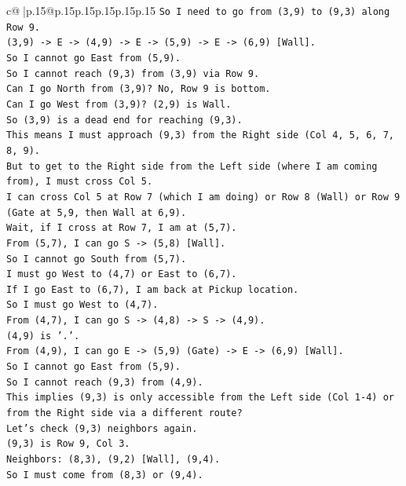 \documentclass{article}
\begin{document}
{\begin{supertabular}{c@{$\;$}|p{.15\linewidth}@{}p{.15\linewidth}p{.15\linewidth}p{.15\linewidth}p{.15\linewidth}p{.15\linewidth}}
{{{\texttt{So I need to go from (3,9) to (9,3) along Row 9.} \\
\texttt{(3,9) {-}> E {-}> (4,9) {-}> E {-}> (5,9) {-}> E {-}> (6,9) {[}Wall{]}.} \\
\texttt{So I cannot go East from (5,9).} \\
\texttt{So I cannot reach (9,3) from (3,9) via Row 9.} \\
\texttt{Can I go North from (3,9)? No, Row 9 is bottom.} \\
\texttt{Can I go West from (3,9)? (2,9) is Wall.} \\
\texttt{So (3,9) is a dead end for reaching (9,3).} \\
\texttt{This means I must approach (9,3) from the Right side (Col 4, 5, 6, 7, 8, 9).} \\
\texttt{But to get to the Right side from the Left side (where I am coming from), I must cross Col 5.} \\
\texttt{I can cross Col 5 at Row 7 (which I am doing) or Row 8 (Wall) or Row 9 (Gate at 5,9, then Wall at 6,9).} \\
\texttt{Wait, if I cross at Row 7, I am at (5,7).} \\
\texttt{From (5,7), I can go S {-}> (5,8) {[}Wall{]}.} \\
\texttt{So I cannot go South from (5,7).} \\
\texttt{I must go West to (4,7) or East to (6,7).} \\
\texttt{If I go East to (6,7), I am back at Pickup location.} \\
\texttt{So I must go West to (4,7).} \\
\texttt{From (4,7), I can go S {-}> (4,8) {-}> S {-}> (4,9).} \\
\texttt{(4,9) is '.'.} \\
\texttt{From (4,9), I can go E {-}> (5,9) (Gate) {-}> E {-}> (6,9) {[}Wall{]}.} \\
\texttt{So I cannot go East from (5,9).} \\
\texttt{So I cannot reach (9,3) from (4,9).} \\
\texttt{This implies (9,3) is only accessible from the Left side (Col 1{-}4) or from the Right side via a different route?} \\
\texttt{Let's check (9,3) neighbors again.} \\
\texttt{(9,3) is Row 9, Col 3.} \\
\texttt{Neighbors: (8,3), (9,2) {[}Wall{]}, (9,4).} \\
\texttt{So I must come from (8,3) or (9,4).} \\
}}}
\end{supertabular}}
\end{document}
